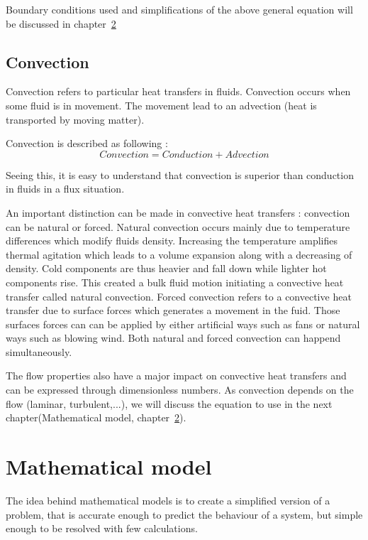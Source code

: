 \documentclass{report}
\begin{document}
	Boundary conditions used and simplifications of the above general equation will be discussed in chapter~\ref{mm}
		
	\section{Convection}\label{cv}
	
	Convection refers to particular heat transfers in fluids. Convection occurs when some fluid is in movement. The movement lead to an advection (heat is transported by moving matter).
	
	Convection is described as following :
	\begin{equation}
		Convection = Conduction + Advection
	\end{equation}
	
	Seeing this, it is easy to understand that convection is superior than conduction in fluids in a flux situation. 
	
	An important distinction can be made in convective heat transfers : convection can be natural or forced.
	Natural convection occurs mainly due to temperature differences which modify fluids density. Increasing the temperature amplifies thermal agitation which leads to a volume expansion along with a decreasing of density. Cold components are thus heavier and fall down while lighter hot components rise. This created a bulk fluid motion initiating a convective heat transfer called natural convection.
	Forced convection refers to a convective heat transfer due to surface forces which generates a movement in the fuid. Those surfaces forces can can be applied by either artificial ways such as fans or natural ways such as blowing wind.
	Both natural and forced convection can happend simultaneously.
	
	The flow properties also have a major impact on convective heat transfers and can be expressed through dimensionless numbers.
	As convection depends on the flow (laminar, turbulent,...), we will discuss the equation to use in the next chapter(Mathematical model, chapter~\ref{mm}).
	
	\chapter{Mathematical model}\label{mm}
	
	The idea behind mathematical models is to create a simplified version of a problem, that is accurate enough to predict the behaviour of a system, but simple enough to be resolved with few calculations.
	
\end{document}
